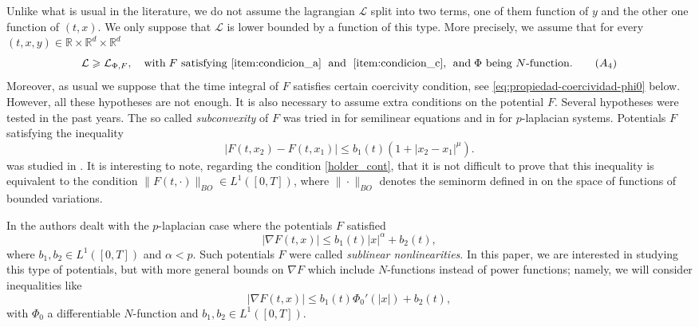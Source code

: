 \documentclass[twoside]{article}
\theoremstyle{remark}
\newcommand{\rr}{\mathbb{R}}
\renewcommand{\leq}{\leqslant}
\renewcommand{\geq}{\geqslant}
\begin{document}
 Unlike what is usual in the literature, we do not assume the lagrangian $\mathcal{L}$  split into two terms, 
one of them function of $y$ and the other one function of $(t,x)$. 
We only suppose that $\mathcal{L}$ is lower bounded by a function of this type. More precisely, we assume that for every $(t,x,y)\in\rr\times\rr^d\times\rr^d$
%
\begin{equation}\label{eq:control_inf}
\mathcal{L} \geq \mathcal{L}_{\Phi,F},\quad \text{with}\;F\text{ satisfying \ref{item:condicion_a} \;and\; \ref{item:condicion_c},  
\;\text{and}\;$\Phi$ being $N$-function}.\tag{$A_4$}
\end{equation}
%
Moreover, as usual we suppose that the time integral of $F$ satisfies certain coercivity condition, see \eqref{eq:propiedad-coercividad-phi0} below.  However,  all these hypotheses are not enough. It is also necessary to assume extra conditions on the potential $F$.
Several hypotheses were tested in the past years. The so called \emph{subconvexity} of $F$ was tried in \cite{wu1999periodic,tang1995periodic,zhao2004periodic} for semilinear equations and in \cite{xu2007some,tang2010periodic} for $p$-laplacian systems. Potentials $F$ satisfying the inequality
\begin{equation}\label{holder_cont}
  \left| F(t,x_2)- F(t,x_1) \right|\leq b_1(t)(1+|x_2-x_1|^{\mu}).
\end{equation}
 was studied in \cite{ABGMS2015}. It is interesting to note, regarding the condition \eqref{holder_cont}, that it is not difficult to prove that this inequality is equivalent to the condition $\|F(t,\cdot)\|_{BO}\in L^1([0,T])$, where $\|\cdot\|_{BO}$ denotes the seminorm defined in  \cite[p. 125]{zhu2012analysis} on the space of functions of bounded variations.
 
 
 In \cite{tang1998periodic, tang2010periodic} the authors  dealt with the $p$-laplacian case where the potentials $F$ satisfied 
\begin{equation}\label{eq:cota_pot} |\nabla F(t,x)|\leq b_1(t)|x|^{\alpha}+b_2(t),
 \end{equation}
where  $b_1,b_2 \in L^1([0,T])$ and $\alpha<p$. Such potentials $F$ 
were called  \emph{sublinear nonlinearities}. In this paper, we are interested in studying this type of potentials, 
but with more general bounds on $\nabla F$ which include $N$-functions instead of power functions; 
namely, we will consider inequalities like
\begin{equation}\label{holder_cont-mu}
  \left| \nabla F(t,x) \right|\leq b_1(t)\Phi_0'(|x|)+b_2(t),
  \tag{$A_5$}
\end{equation}
with $\Phi_0$  a differentiable $N$-function and $b_1,b_2 \in L^1([0,T])$.
\end{document}

